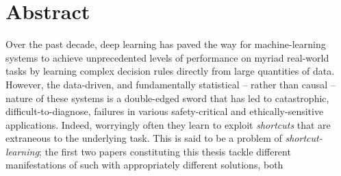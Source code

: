 \begingroup
\let\clearpage\relax
\let\cleardoublepage\relax
\let\cleardoublepage\relax

\chapter*{Abstract}
%
%
Over the past decade, deep learning has paved the way for machine-learning systems to achieve
unprecedented levels of performance on myriad real-world tasks by learning complex decision rules
directly from large quantities of data.
%
However, the data-driven, and fundamentally statistical -- rather than causal -- nature of these
systems is a double-edged sword that has led to catastrophic, difficult-to-diagnose, failures in
various safety-critical and ethically-sensitive applications.
%
%
Indeed, worryingly often they learn to exploit \emph{shortcuts} that are extraneous to the
underlying task.
%
%
This is said to be a problem of \emph{shortcut-learning}; the first two papers constituting this
thesis tackle different manifestations of such with appropriately different solutions, both
